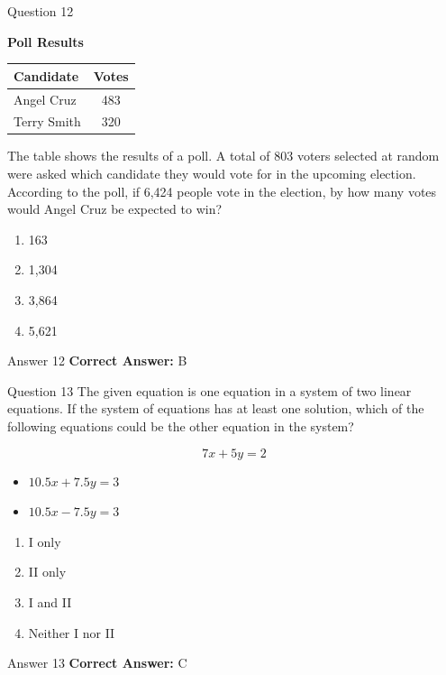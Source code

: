 \documentclass{beamer}
\begin{document}
\begin{frame}{Question 12}
\small
\begin{center}
    

\textbf{Poll Results}

\begin{tabular}{|l|c|}
\hline
Candidate & Votes \\
\hline
Angel Cruz & 483 \\
Terry Smith & 320 \\
\hline
\end{tabular}
\end{center}

The table shows the results of a poll. A total of 803 voters selected at random were asked which candidate they would vote for in the upcoming election.  
According to the poll, if 6,424 people vote in the election, by how many votes would Angel Cruz be expected to win?
\vspace{0.35cm}
\begin{enumerate}
    \item[A.] 163
    \item[B.] 1,304
    \item[C.] 3,864
    \item[D.] 5,621
\end{enumerate}
\end{frame}
\begin{frame}{Answer 12}
\small
\textbf{Correct Answer:} B
\end{frame}

\begin{frame}{Question 13}
\small
The given equation is one equation in a system of two linear equations.  
If the system of equations has at least one solution, which of the following equations could be the other equation in the system?

\[
7x + 5y = 2
\]

\begin{itemize}
    \item[I.] \(10.5x + 7.5y = 3\)
    \item[II.] \(10.5x - 7.5y = 3\)
\end{itemize}
\vspace{0.35cm}
\begin{enumerate}
    \item[A.] I only
    \item[B.] II only
    \item[C.] I and II
    \item[D.] Neither I nor II
\end{enumerate}
\end{frame}
\begin{frame}{Answer 13}
\small
\textbf{Correct Answer:} C
\end{frame}
\end{document}
